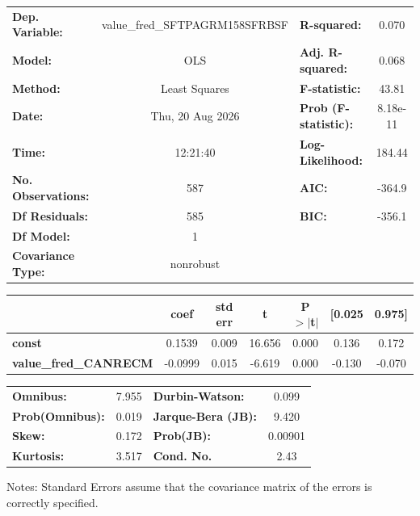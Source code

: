 \begin{center}
\begin{tabular}{lclc}
\toprule
\textbf{Dep. Variable:}       & value\_fred\_SFTPAGRM158SFRBSF & \textbf{  R-squared:         } &     0.070   \\
\textbf{Model:}               &              OLS               & \textbf{  Adj. R-squared:    } &     0.068   \\
\textbf{Method:}              &         Least Squares          & \textbf{  F-statistic:       } &     43.81   \\
\textbf{Date:}                &        Thu, 20 Aug 2026        & \textbf{  Prob (F-statistic):} &  8.18e-11   \\
\textbf{Time:}                &            12:21:40            & \textbf{  Log-Likelihood:    } &    184.44   \\
\textbf{No. Observations:}    &                587             & \textbf{  AIC:               } &    -364.9   \\
\textbf{Df Residuals:}        &                585             & \textbf{  BIC:               } &    -356.1   \\
\textbf{Df Model:}            &                  1             & \textbf{                     } &             \\
\textbf{Covariance Type:}     &           nonrobust            & \textbf{                     } &             \\
\bottomrule
\end{tabular}
\begin{tabular}{lcccccc}
                              & \textbf{coef} & \textbf{std err} & \textbf{t} & \textbf{P$> |$t$|$} & \textbf{[0.025} & \textbf{0.975]}  \\
\midrule
\textbf{const}                &       0.1539  &        0.009     &    16.656  &         0.000        &        0.136    &        0.172     \\
\textbf{value\_fred\_CANRECM} &      -0.0999  &        0.015     &    -6.619  &         0.000        &       -0.130    &       -0.070     \\
\bottomrule
\end{tabular}
\begin{tabular}{lclc}
\textbf{Omnibus:}       &  7.955 & \textbf{  Durbin-Watson:     } &    0.099  \\
\textbf{Prob(Omnibus):} &  0.019 & \textbf{  Jarque-Bera (JB):  } &    9.420  \\
\textbf{Skew:}          &  0.172 & \textbf{  Prob(JB):          } &  0.00901  \\
\textbf{Kurtosis:}      &  3.517 & \textbf{  Cond. No.          } &     2.43  \\
\bottomrule
\end{tabular}
\end{center}

Notes: \newline
 [1] Standard Errors assume that the covariance matrix of the errors is correctly specified.